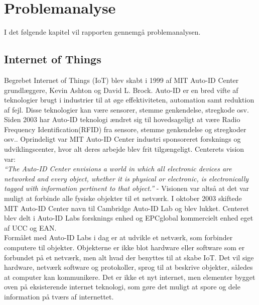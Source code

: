 \chapter{Problemanalyse}

    I det følgende kapitel vil rapporten gennemgå problemanalysen.
    
    \section{Internet of Things}
        Begrebet Internet of Things (IoT) blev skabt i 1999 af MIT Auto-ID Center grundlæggere, Kevin Ashton og David L. Brock.\autocite{Hashmi2017} Auto-ID er en bred vifte af teknologier brugt i industrier til at øge effektiviteten, automation samt reduktion af fejl. Disse teknologier kan være sensorer, stemme genkendelse, stregkode osv.
        Siden 2003 har Auto-ID teknologi ændret sig til hovedsageligt at være Radio Frequency Identification(RFID) fra sensore, stemme genkendelse og stregkoder osv.\autocite{Sundmaeker2010}. Oprindeligt var MIT Auto-ID Center industri sponsoreret forsknings og udviklingscenter, hvor alt deres arbejde blev frit tilgængeligt. Centerets vision var:\\
        \textit{``The Auto-ID Center envisions a world in which all electronic devices are networked and every object, whether it is physical or electronic, is electronically tagged with information pertinent to that object.''} -\autocite[Kapitel 2,p. ~4]{Sarma2001} Visionen var altså at det var muligt at forbinde alle fysiske objekter til et netværk. 
        I oktober 2003 skiftede MIT Auto-ID Center navn til Cambridge Auto-ID Lab og blev lukket. Centeret blev delt i Auto-ID Labs forsknings enhed og EPCglobal kommercielt enhed eget af UCC og EAN.\autocite{Sundmaeker2010}\\
        Formålet med Auto-ID Labs i dag er at udvikle et netværk, som forbinder computere til objekter. Objekterne er ikke blot hardware eller software som er forbundet på et netværk, men alt hvad der benyttes til at skabe IoT. Det vil sige hardware, netværk software og protokoller, sprog til at beskrive objekter, således at computer kan kommunikere. Det er ikke et nyt internet, men elementer bygget oven på eksisterende internet teknologi, som gøre det muligt at spore og dele information på tværs af internettet.\autocite{Sundmaeker2010} \\
